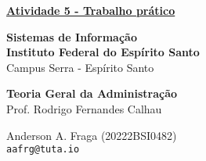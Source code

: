 \documentclass[11pt]{article}
\begin{document}
\underline{\textbf{Atividade 5 - Trabalho prático}}\par
\textbf{Sistemas de Informação}\\
\textbf{Instituto Federal do Espírito Santo}\\
Campus Serra - Espírito Santo\par
\textbf{Teoria Geral da Administração}\\
Prof. Rodrigo Fernandes Calhau\par
Anderson A. Fraga (20222BSI0482)\\
\texttt{aafrg@tuta.io}\\  %
\end{document}
